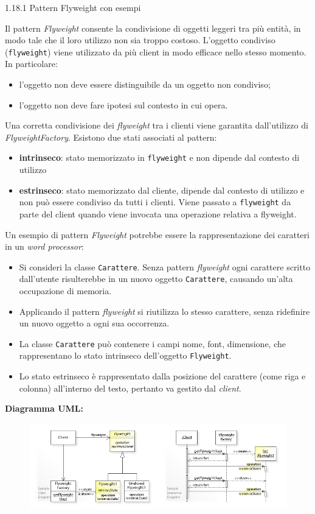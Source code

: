 \begin{problem}{1.18.1}
Pattern Flyweight con esempi
\end{problem}
\begin{solution}
Il pattern \textit{Flyweight} consente la condivisione di oggetti leggeri tra più entità, in modo tale che il loro utilizzo non sia troppo costoso.
L'oggetto condiviso (\texttt{flyweight}) viene utilizzato da più client in modo efficace nello stesso momento.
In particolare:
\begin{itemize}
	\item l'oggetto non deve essere distinguibile da un oggetto non condiviso;
	\item l'oggetto non deve fare ipotesi sul contesto in cui opera.
\end{itemize}
Una corretta condivisione dei \textit{flyweight} tra i clienti viene garantita dall'utilizzo di \textit{FlyweightFactory}.
Esistono due stati associati al pattern:
\begin{itemize}
	\item \textbf{intrinseco}: stato memorizzato in \texttt{flyweight} e non dipende dal contesto di utilizzo
	\item \textbf{estrinseco}: stato memorizzato dal cliente, dipende dal contesto di utilizzo e non può essere condiviso da tutti i clienti.
	Viene passato a \texttt{flyweight} da parte del client quando viene invocata una operazione relativa a flyweight.
\end{itemize}
Un esempio di pattern \textit{Flyweight} potrebbe essere la rappresentazione dei caratteri in un \textit{word processor}:
\begin{itemize}
	\item Si consideri la classe \texttt{Carattere}. Senza pattern \textit{flyweight} ogni carattere scritto dall'utente risulterebbe in un nuovo oggetto \texttt{Carattere}, causando un'alta occupazione di memoria.
	\item Applicando il pattern \textit{flyweight} si riutilizza lo stesso carattere, senza ridefinire un nuovo oggetto a ogni sua occorrenza.
	\item La classe \texttt{Carattere} può contenere i campi nome, font, dimensione, che rappresentano lo stato intrinseco dell'oggetto \texttt{Flyweight}.
	\item Lo stato estrinseco è rappresentato dalla posizione del carattere (come riga e colonna) all'interno del testo, pertanto va gestito dal \textit{client}.
\end{itemize}
\newpage
\textbf{Diagramma UML:}
\begin{figure}[htb!]
	\centering
	\label{FlyweightPattern}
	\includegraphics[width=\textwidth]{./immagini/flyweightPattern.png}
\end{figure}
\end{solution}

